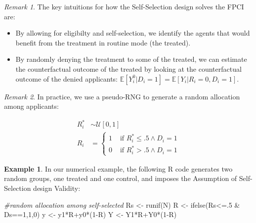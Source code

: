 \documentclass[
]{book}
\newenvironment{Shaded}{\begin{snugshade}}{\end{snugshade}}
\newcommand{\CommentTok}[1]{\textcolor[rgb]{0.56,0.35,0.01}{\textit{#1}}}
\newcommand{\DecValTok}[1]{\textcolor[rgb]{0.00,0.00,0.81}{#1}}
\newcommand{\FunctionTok}[1]{\textcolor[rgb]{0.00,0.00,0.00}{#1}}
\newcommand{\NormalTok}[1]{#1}
\newcommand{\OtherTok}[1]{\textcolor[rgb]{0.56,0.35,0.01}{#1}}
\newcommand{\SpecialCharTok}[1]{\textcolor[rgb]{0.00,0.00,0.00}{#1}}
\providecommand{\tightlist}{%
  \setlength{\itemsep}{0pt}\setlength{\parskip}{0pt}}
\newcommand{\esp}[1]{\mathbb{E}[ #1 ]}
\theoremstyle{definition}
\theoremstyle{definition}
\newtheorem{example}{Example}[chapter]
\theoremstyle{definition}
\theoremstyle{definition}
\theoremstyle{remark}
\newtheorem*{remark}{Remark}
\begin{document}
\begin{remark}
\iffalse{} {Remark. } \fi{}The key intuitions for how the Self-Selection design solves the FPCI are:
\end{remark}

\begin{itemize}
\tightlist
\item
  By allowing for eligibilty and self-selection, we identify the agents that would benefit from the treatment in routine mode (the treated).
\item
  By randomly denying the treatment to some of the treated, we can estimate the counterfactual outcome of the treated by looking at the counterfactual outcome of the denied applicants: \(\esp{Y_i^0|D_i=1}=\esp{Y_i|R_i=0,D_i=1}\).
\end{itemize}

\begin{remark}
\iffalse{} {Remark. } \fi{}In practice, we use a pseudo-RNG to generate a random allocation among applicants:
\end{remark}
\begin{align*}
  R_i^* & \sim \mathcal{U}[0,1]\\
  R_i & = 
  \begin{cases}
    1 & \text{ if } R_i^*\leq .5 \land D_i=1\\
    0 & \text{ if } R_i^*> .5 \land D_i=1
  \end{cases}
\end{align*}

\begin{example}
\protect\hypertarget{exm:unnamed-chunk-82}{}{\label{exm:unnamed-chunk-82} }In our numerical example, the following R code generates two random groups, one treated and one control, and imposes the Assumption of Self-Selection design Validity:
\end{example}

\begin{Shaded}
\begin{Highlighting}[]
\CommentTok{\#random allocation among self{-}selected}
\NormalTok{Rs }\OtherTok{\textless{}{-}} \FunctionTok{runif}\NormalTok{(N)}
\NormalTok{R }\OtherTok{\textless{}{-}} \FunctionTok{ifelse}\NormalTok{(Rs}\SpecialCharTok{\textless{}=}\NormalTok{.}\DecValTok{5} \SpecialCharTok{\&}\NormalTok{ Ds}\SpecialCharTok{==}\DecValTok{1}\NormalTok{,}\DecValTok{1}\NormalTok{,}\DecValTok{0}\NormalTok{)}
\NormalTok{y }\OtherTok{\textless{}{-}}\NormalTok{ y1}\SpecialCharTok{*}\NormalTok{R}\SpecialCharTok{+}\NormalTok{y0}\SpecialCharTok{*}\NormalTok{(}\DecValTok{1}\SpecialCharTok{{-}}\NormalTok{R)}
\NormalTok{Y }\OtherTok{\textless{}{-}}\NormalTok{ Y1}\SpecialCharTok{*}\NormalTok{R}\SpecialCharTok{+}\NormalTok{Y0}\SpecialCharTok{*}\NormalTok{(}\DecValTok{1}\SpecialCharTok{{-}}\NormalTok{R)}
\end{Highlighting}
\end{Shaded}
\end{document}
